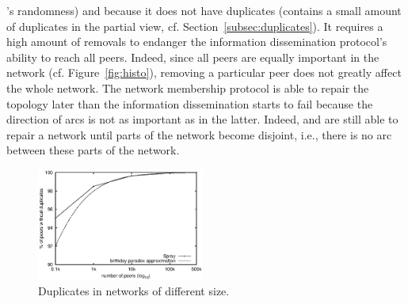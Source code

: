 \begin{asparadesc}
  \SPRAY's randomness) and because it does not have duplicates (\SPRAY contains
  a small amount of duplicates in the partial view,
  cf. Section~\ref{subsec:duplicates}). It requires a high amount of removals
  to endanger the information dissemination protocol's ability to reach all
  peers. Indeed, since all peers are equally important in the network
  (cf. Figure~\ref{fig:histo}), removing a particular peer does not greatly
  affect the whole network. The network membership protocol is able to repair
  the topology later than the information dissemination starts to fail because
  the direction of arcs is not as important as in the latter. Indeed, \CYCLON
  and \SPRAY are still able to repair a network until parts of the network
  become disjoint, i.e., there is no arc between these parts of the network.
\end{asparadesc}

\begin{figure}
  \centering
  \includegraphics[width=0.49\textwidth]{img/duplicates.eps}
  \caption{\label{fig:duplicates}Duplicates in networks of different size.}
\end{figure}

\ \\

